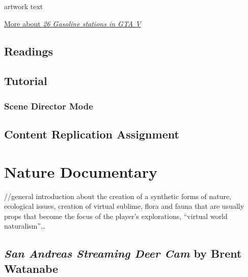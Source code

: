 \documentclass[
  openany]{book}
\begin{document}
artwork text

\href{https://www.mearlwilliams.com/gasoline_stations\#1}{More about \emph{26 Gasoline stations in GTA V}}

\hypertarget{readings-2}{%
\section*{Readings}\label{readings-2}}

\hypertarget{tutorial-2}{%
\section*{Tutorial}\label{tutorial-2}}

\hypertarget{scene-director-mode}{%
\subsection*{Scene Director Mode}\label{scene-director-mode}}

\hypertarget{content-replication-assignment-2}{%
\section*{Content Replication Assignment}\label{content-replication-assignment-2}}

\hypertarget{nature-documentary}{%
\chapter{Nature Documentary}\label{nature-documentary}}

//general introduction about the creation of a synthetic forms of nature, ecological issues, creation of virtual sublime, flora and fauna that are usually props that become the focus of the player's explorations, ``virtual world naturalism''\ldots{}

\hypertarget{san-andreas-streaming-deer-cam-by-brent-watanabe}{%
\section*{\texorpdfstring{\emph{San Andreas Streaming Deer Cam} by Brent Watanabe}{San Andreas Streaming Deer Cam by Brent Watanabe}}\label{san-andreas-streaming-deer-cam-by-brent-watanabe}}
\end{document}
